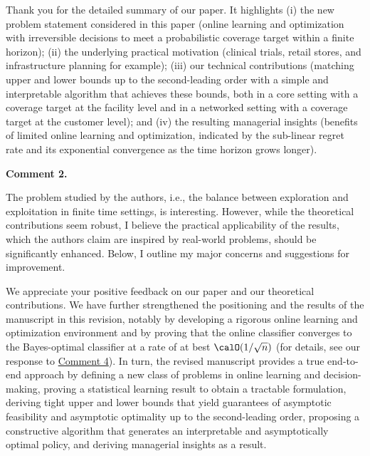 \documentclass[11pt]{article}
\begin{document}
Thank you for the detailed summary of our paper. It highlights (i) the new problem statement considered in this paper (online learning and optimization with irreversible decisions to meet a probabilistic coverage target within a finite horizon); (ii) the underlying practical motivation (clinical trials, retail stores, and infrastructure planning for example); (iii) our technical contributions (matching upper and lower bounds up to the second-leading order with a simple and interpretable algorithm that achieves these bounds, both in a core setting with a coverage target at the facility level and in a networked setting with a coverage target at the customer level); and (iv) the resulting managerial insights (benefits of limited online learning and optimization, indicated by the sub-linear regret rate and its exponential convergence as the time horizon grows longer).

\begin{commentBox}
    \textbf{Comment 2.}\label{R3:2}

    The problem studied by the authors, i.e., the balance between exploration and exploitation in finite time settings, is interesting. However, while the theoretical contributions seem robust, I believe the practical applicability of the results, which the authors claim are inspired by real-world problems, should be significantly enhanced. Below, I outline my major concerns and suggestions for improvement.
\end{commentBox}

We appreciate your positive feedback on our paper and our theoretical contributions. We have further strengthened the positioning and the results of the manuscript in this revision, notably by developing a rigorous online learning and optimization environment and by proving that the online classifier converges to the Bayes-optimal classifier at a rate of at best $\calO(1/\sqrt n)$ (for details, see our response to \hyperref[R3:4]{\color{blue}Comment 4}). In turn, the revised manuscript provides a true end-to-end approach by defining a new class of problems in online learning and decision-making, proving a statistical learning result to obtain a tractable formulation, deriving tight upper and lower bounds that yield guarantees of asymptotic feasibility and asymptotic optimality up to the second-leading order, proposing a constructive algorithm that generates an interpretable and asymptotically optimal policy, and deriving managerial insights as a result.
\end{document}
